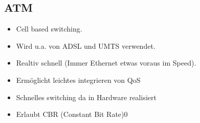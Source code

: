 \subsection{ATM}

\begin{itemize}
	\item Cell based switching.
	\item Wird u.a. von ADSL und UMTS verwendet.
	\item Realtiv schnell (Immer Ethernet etwas voraus im Speed).
	\item Ermöglicht leichtes integrieren von QoS
	\item Schnelles switching da in Hardware realisiert
	\item Erlaubt CBR (Constant Bit Rate)0
\end{itemize}

